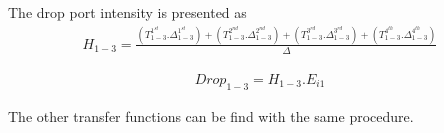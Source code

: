 \documentclass{osa-article}
\begin{document}
The drop port intensity is presented as
\begin{equation}
\begin{split}
H_{1-3}=\frac{(T^{1^{st}}_{1-3}.\Delta^{1^{st}}_{1-3})+(T^{2^{nd}}_{1-3}.\Delta^{2^{nd}}_{1-3})+(T^{3^{rd}}_{1-3}.\Delta^{3^{rd}}_{1-3})+(T^{4^{th}}_{1-3}.\Delta^{4^{th}}_{1-3})}{\Delta}
\end{split}
\end{equation}

\begin{equation}
\begin{split}
Drop_{1-3}=H_{1-3}.E_{i1}
\end{split}
\end{equation}

The other transfer functions can be find with the same procedure.\\



%


 
%
%
%
%
\end{document}
